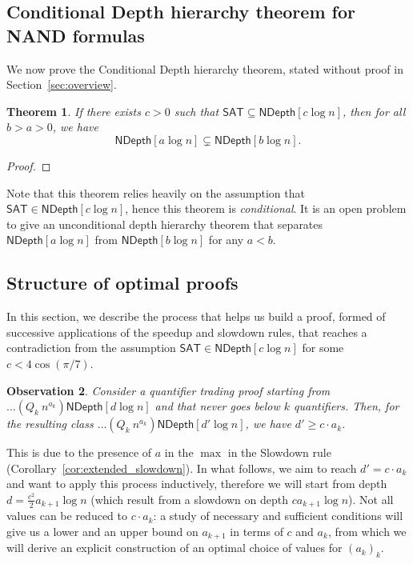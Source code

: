 \documentclass[a4paper, 11pt]{article}
\theoremstyle{plain}
\newtheorem{theorem}{Theorem}[section] %
\newtheorem{observation}[theorem]{Observation}
\theoremstyle{definition}
\theoremstyle{remark}
\newcommand{\SAT}{\textsf{SAT}}%
\newcommand{\ND}{\textsf{NDepth}}%
\newcommand{\NDL}[1]{\ND\left[ #1 \log n\right]}%
\begin{document}
\subsection{Conditional Depth hierarchy theorem for \textsf{NAND} formulas}

We now prove the Conditional Depth hierarchy theorem, 
stated without proof in Section~\ref{sec:overview}.
\begin{theorem}
	If there exists $c > 0$ such that $\SAT \subseteq \NDL{c}$, 
	then for all $b > a > 0$, we have
	\[\NDL{a} \subsetneq \NDL{b}.\] 
\end{theorem}
\begin{proof}
	
\end{proof}

Note that this theorem relies heavily on the assumption that $\SAT\in\NDL{c}$,
hence this theorem is \textit{conditional}.
It is an open problem to give an unconditional depth hierarchy theorem that 
separates $\NDL{a}$ from $\NDL{b}$ for any $a < b$.

\subsection{Structure of optimal proofs}
In this section, we describe
the process that helps us build a proof, formed of successive applications
of the speedup and slowdown rules, 
that reaches a contradiction from the assumption
$\SAT\in\NDL{c}$ for some $c < 4\cos(\pi /7)$.

\begin{observation}
	Consider a quantifier trading proof starting from $\ldots (Q_k~n^{a_k})\NDL{d}$
	and that never goes below $k$ quantifiers.
	Then, for the resulting class $\ldots (Q_k~n^{a_k})\NDL{d'}$, we have $d' \ge c\cdot a_k$.
\end{observation}
This is due to the presence of $a$ in the $\max$ in the Slowdown 
rule (Corollary~\ref{cor:extended_slowdown}).
In what follows, we aim to reach $d' = c\cdot a_k$ 
and want to apply this process inductively,
therefore we will start from depth $d = \frac{c^2}{2}a_{k+1}\log n$
(which result from a slowdown on depth $ca_{k+1}\log n$).
Not all values can be reduced to $c\cdot a_k$: 
a study of necessary and sufficient conditions
will give us a lower and an upper bound on $a_{k+1}$ in terms of $c$ and $a_k$,
from which we will derive an explicit construction of an optimal choice of values for $(a_k)_k$.
\end{document}
